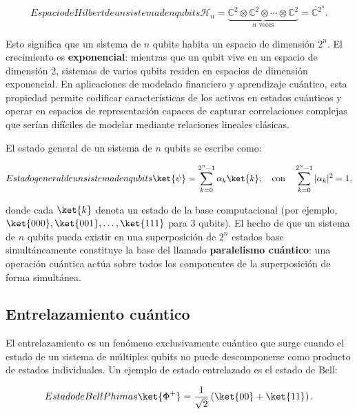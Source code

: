 \begin{equation}[ap:eq:producto_tensorial]{Espacio de Hilbert de un sistema de n qubits}
\mathcal{H}_n = \underbrace{\mathbb{C}^2 \otimes \mathbb{C}^2 \otimes \cdots \otimes \mathbb{C}^2}_{n \text{ veces}} = \mathbb{C}^{2^n}.
\end{equation}

Esto significa que un sistema de $n$ qubits habita un espacio de dimensión $2^n$. El crecimiento es \textbf{exponencial}: mientras que un qubit vive en un espacio de dimensión 2, sistemas de varios qubits residen en espacios de dimensión exponencial. En aplicaciones de modelado financiero y aprendizaje cuántico, esta propiedad permite codificar características de los activos en estados cuánticos y operar en espacios de representación capaces de capturar correlaciones complejas que serían difíciles de modelar mediante relaciones lineales clásicas.

El estado general de un sistema de $n$ qubits se escribe como:

\begin{equation}[ap:eq:estadonqubits]{Estado general de un sistema de n qubits}
\ket{\psi} = \sum_{k=0}^{2^{n} - 1} {\alpha}_{k} \ket{k}, \quad \text{con} \quad \sum_{k=0}^{2^{n} - 1} |{\alpha}_{k}|^{2} = 1,
\end{equation}

donde cada $\ket{k}$ denota un estado de la base computacional (por ejemplo, $\ket{000}, \ket{001}, \ldots, \ket{111}$ para 3 qubits). El hecho de que un sistema de $n$ qubits pueda existir en una superposición de $2^n$ estados base simultáneamente constituye la base del llamado \textbf{paralelismo cuántico}: una operación cuántica actúa sobre todos los componentes de la superposición de forma simultánea.

\subsection{Entrelazamiento cuántico}
\label{ap:subsec:entrelazamiento}

El entrelazamiento es un fenómeno exclusivamente cuántico que surge cuando el estado de un sistema de múltiples qubits no puede descomponerse como producto de estados individuales. Un ejemplo de estado entrelazado es el estado de Bell:

\begin{equation}[ap:eq:bell]{Estado de Bell Phi mas}
\ket{\Phi^+} = \frac{1}{\sqrt{2}}\left(\ket{00} + \ket{11}\right).
\end{equation}


